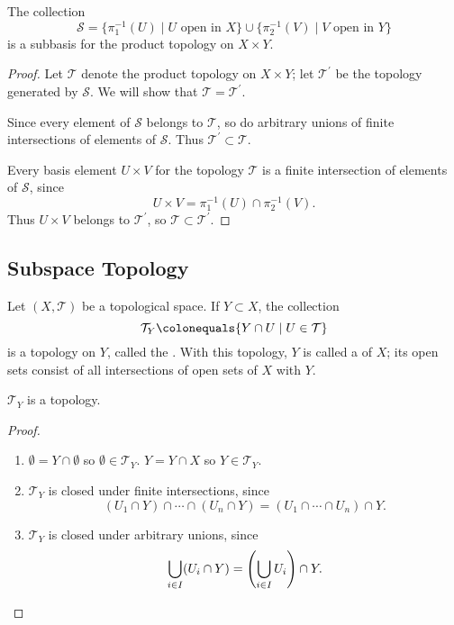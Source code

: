\begin{lemma}
The collection
\[\mathcal{S}=\{\pi_1^{-1}(U)\mid U\text{ open in }X\}\cup\{\pi_2^{-1}(V)\mid V\text{ open in }Y\}\]
is a subbasis for the product topology on $X\times Y$.
\end{lemma}

\begin{proof}
Let $\mathcal{T}$ denote the product topology on $X\times Y$; let $\mathcal{T}^\prime$ be the topology generated by $\mathcal{S}$. We will show that $\mathcal{T}=\mathcal{T}^\prime$.

\fbox{$\supset$} Since every element of $\mathcal{S}$ belongs to $\mathcal{T}$, so do arbitrary unions of finite intersections of elements of $\mathcal{S}$. Thus $\mathcal{T}^\prime\subset\mathcal{T}$.

\fbox{$\subset$} Every basis element $U\times V$ for the topology $\mathcal{T}$ is a finite intersection of elements of $\mathcal{S}$, since
\[U\times V=\pi_1^{-1}(U)\cap\pi_2^{-1}(V).\]
Thus $U\times V$ belongs to $\mathcal{T}^\prime$, so $\mathcal{T}\subset\mathcal{T}^\prime$.
\end{proof}

\subsection{Subspace Topology}
\begin{definition}
Let $(X,\mathcal{T})$ be a topological space. If $Y\subset X$, the collection
\[\mathcal{T}_Y\colonequals\{Y\cap U\mid U\in\mathcal{T}\}\]
is a topology on $Y$, called the . With this topology, $Y$ is called a  of $X$; its open sets consist of all intersections of open sets of $X$ with $Y$.
\end{definition}

\begin{lemma*}
$\mathcal{T}_Y$ is a topology.
\end{lemma*}

\begin{proof} \
\begin{enumerate}[label=(\roman*)]
\item $\emptyset=Y\cap\emptyset$ so $\emptyset\in\mathcal{T}_Y$. $Y=Y\cap X$ so $Y\in\mathcal{T}_Y$.
\item $\mathcal{T}_Y$ is closed under finite intersections, since
\[(U_1\cap Y)\cap\cdots\cap(U_n\cap Y)=(U_1\cap\cdots\cap U_n)\cap Y.\]
\item $\mathcal{T}_Y$ is closed under arbitrary unions, since
\[\bigcup_{i\in I}(U_i\cap Y)=\left(\bigcup_{i\in I}U_i\right)\cap Y.\]
\end{enumerate}
\end{proof}

